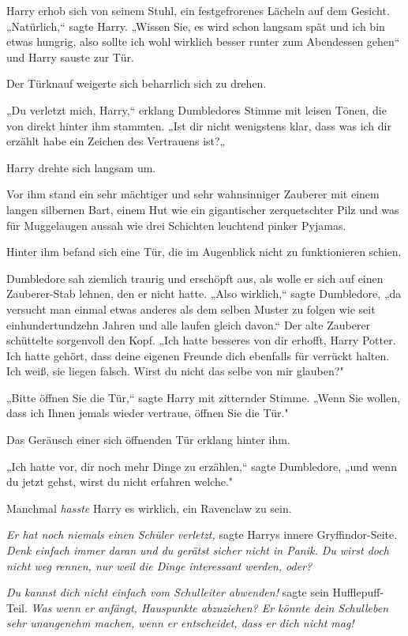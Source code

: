 {Harry erhob sich von seinem Stuhl, ein festgefrorenes Lächeln auf dem Gesicht. „Natürlich,“ sagte Harry. „Wissen Sie, es wird schon langsam spät und ich bin etwas hungrig, also sollte ich wohl wirklich besser runter zum Abendessen gehen“ und Harry sauste zur Tür.

Der Türknauf weigerte sich beharrlich sich zu drehen.

„Du verletzt mich, Harry,“ erklang Dumbledores Stimme mit leisen Tönen, die von direkt hinter ihm stammten. „Ist dir nicht wenigstens klar, dass was ich dir erzählt habe ein Zeichen des Vertrauens ist?„

Harry drehte sich langsam um.

Vor ihm stand ein sehr mächtiger und sehr wahnsinniger Zauberer mit einem langen silbernen Bart, einem Hut wie ein gigantischer zerquetschter Pilz und was für Muggelaugen aussah wie drei Schichten leuchtend pinker Pyjamas.

Hinter ihm befand sich eine Tür, die im Augenblick nicht zu funktionieren schien.

Dumbledore sah ziemlich traurig und erschöpft aus, als wolle er sich auf einen Zauberer-Stab lehnen, den er nicht hatte. „Also wirklich,“ sagte Dumbledore, „da versucht man einmal etwas anderes als dem selben Muster zu folgen wie seit einhundertundzehn Jahren und alle laufen gleich davon.“ Der alte Zauberer schüttelte sorgenvoll den Kopf. „Ich hatte besseres von dir erhofft, Harry Potter. Ich hatte gehört, dass deine eigenen Freunde dich ebenfalls für verrückt halten. Ich weiß, sie liegen falsch. Wirst du nicht das selbe von mir glauben?"

„Bitte öffnen Sie die Tür,“ sagte Harry mit zitternder Stimme. „Wenn Sie wollen, dass ich Ihnen jemals wieder vertraue, öffnen Sie die Tür."

Das Geräusch einer sich öffnenden Tür erklang hinter ihm.

„Ich hatte vor, dir noch mehr Dinge zu erzählen,“ sagte Dumbledore, „und wenn du jetzt gehst, wirst du nicht erfahren welche."

Manchmal \emph{hasste} Harry es wirklich, ein Ravenclaw zu sein.

\emph{Er hat noch niemals einen Schüler verletzt,} sagte Harrys innere Gryffindor-Seite. \emph{Denk einfach immer daran und du gerätst sicher nicht in Panik. Du wirst doch nicht weg rennen, nur weil die Dinge interessant werden, oder?}

\emph{Du kannst dich nicht einfach vom Schulleiter abwenden!} sagte sein Hufflepuff-Teil. \emph{Was wenn er anfängt, Hauspunkte abzuziehen? Er könnte dein Schulleben sehr unangenehm machen, wenn er entscheidet, dass er dich nicht mag!}

}
